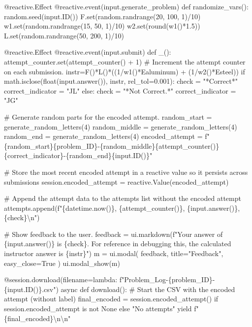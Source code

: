 \documentclass[
  letterpaper,
  DIV=11,
  numbers=noendperiod]{scrreprt}
\newenvironment{Shaded}{\begin{snugshade}}{\end{snugshade}}
\newcommand{\NormalTok}[1]{\textcolor[rgb]{0.00,0.23,0.31}{#1}}
\begin{document}
\begin{Shaded}
\begin{Highlighting}[]
\NormalTok{    @reactive.Effect}
\NormalTok{    @reactive.event(input.generate\_problem)}
\NormalTok{    def randomize\_vars():}
\NormalTok{        random.seed(input.ID())}
\NormalTok{        F.set(random.randrange(20, 100, 1)/10)}
\NormalTok{        w1.set(random.randrange(15, 50, 1)/10)}
\NormalTok{        w2.set(round(w1()*1.5))}
\NormalTok{        L.set(random.randrange(50, 200, 1)/10)}
        
\NormalTok{    @reactive.Effect}
\NormalTok{    @reactive.event(input.submit)}
\NormalTok{    def \_():}
\NormalTok{        attempt\_counter.set(attempt\_counter() + 1)  \# Increment the attempt counter on each submission.}
\NormalTok{        instr=F()*L()*((1/w1()*Ealuminum) + (1/w2()*Esteel))}
\NormalTok{        if math.isclose(float(input.answer()), instr, rel\_tol=0.001):}
\NormalTok{            check = "*Correct*"}
\NormalTok{            correct\_indicator = "JL"}
\NormalTok{        else:}
\NormalTok{            check = "*Not Correct.*"}
\NormalTok{            correct\_indicator = "JG"}

\NormalTok{        \# Generate random parts for the encoded attempt.}
\NormalTok{        random\_start = generate\_random\_letters(4)}
\NormalTok{        random\_middle = generate\_random\_letters(4)}
\NormalTok{        random\_end = generate\_random\_letters(4)}
\NormalTok{        encoded\_attempt = f"\{random\_start\}\{problem\_ID\}{-}\{random\_middle\}\{attempt\_counter()\}\{correct\_indicator\}{-}\{random\_end\}\{input.ID()\}"}

\NormalTok{        \# Store the most recent encoded attempt in a reactive value so it persists across submissions}
\NormalTok{        session.encoded\_attempt = reactive.Value(encoded\_attempt)}

\NormalTok{        \# Append the attempt data to the attempts list without the encoded attempt}
\NormalTok{        attempts.append(f"\{datetime.now()\}, \{attempt\_counter()\}, \{input.answer()\}, \{check\}\textbackslash{}n")}

\NormalTok{        \# Show feedback to the user.}
\NormalTok{        feedback = ui.markdown(f"Your answer of \{input.answer()\} is \{check\}. For reference in debugging this, the calculated instructor answer is \{instr\}")}
\NormalTok{        m = ui.modal(}
\NormalTok{            feedback,}
\NormalTok{            title="Feedback",}
\NormalTok{            easy\_close=True}
\NormalTok{        )}
\NormalTok{        ui.modal\_show(m)}

\NormalTok{    @session.download(filename=lambda: f"Problem\_Log{-}\{problem\_ID\}{-}\{input.ID()\}.csv")}
\NormalTok{    async def download():}
\NormalTok{        \# Start the CSV with the encoded attempt (without label)}
\NormalTok{        final\_encoded = session.encoded\_attempt() if session.encoded\_attempt is not None else "No attempts"}
\NormalTok{        yield f"\{final\_encoded\}\textbackslash{}n\textbackslash{}n"}
        

\end{Highlighting}
\end{Shaded}
\end{document}
